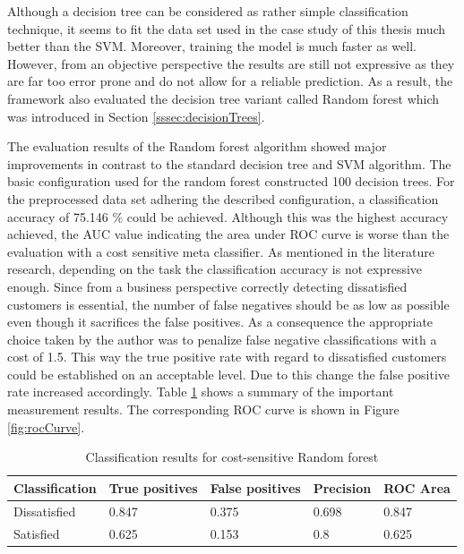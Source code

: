 Although a decision tree can be considered as rather simple classification technique, it seems to fit the data set used in the case study of this thesis much better than the SVM. Moreover, training the model is much faster as well. However, from an objective perspective the results are still not expressive as they are far too error prone and do not allow for a reliable prediction. As a result, the framework also evaluated the decision tree variant called Random forest which was introduced in Section \ref{sssec:decisionTrees}. 

The evaluation results of the Random forest algorithm showed major improvements in contrast to the standard decision tree and SVM algorithm. The basic configuration used for the random forest constructed 100 decision trees. For the preprocessed data set adhering the described configuration, a classification accuracy of 75.146 \% could be achieved. Although this was the highest accuracy achieved, the AUC value indicating the area under ROC curve is worse than the evaluation with a cost sensitive meta classifier. As mentioned in the literature research, depending on the task the classification accuracy is not expressive enough. Since from a business perspective correctly detecting dissatisfied customers is essential, the number of false negatives should be as low as possible even though it sacrifices the false positives. As a consequence the appropriate choice taken by the author was to penalize false negative classifications with a cost of 1.5. This way the true positive rate with regard to dissatisfied customers could be established on an acceptable level. Due to this change the false positive rate increased accordingly. Table \ref{tab:classificationResults} shows a summary of the important measurement results. The corresponding ROC curve is shown in Figure \ref{fig:rocCurve}. 

\begin{table}[]
	\centering
	\begin{tabular}{|l|l|l|l|l|}
		\hline
		\textbf{Classification} & \textbf{True positives} & \textbf{False positives} & \textbf{Precision} & \textbf{ROC Area} \\ \hline
		Dissatisfied            & 0.847                   & 0.375                    & 0.698              & 0.847             \\ \hline
		Satisfied               & 0.625                   & 0.153                    & 0.8                & 0.625             \\ \hline
	\end{tabular}
 	\caption{Classification results for cost-sensitive Random forest}
 	\label{tab:classificationResults}
 \end{table}

